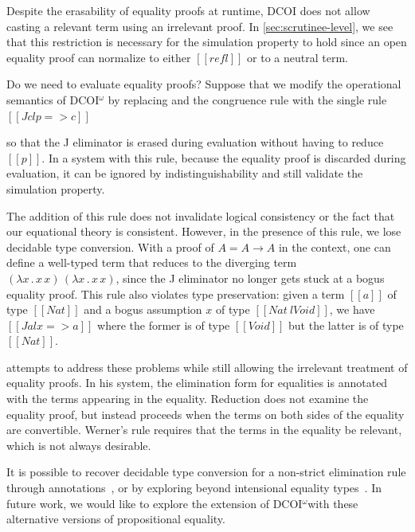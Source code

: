 \documentclass[acmsmall, screen=true, nonacm=true,
  review=\ifpublic false\else true\fi,
  anonymous=\ifanonymous true\else false\fi
]{acmart}
\makeatletter
\newcommand{\sw}[1]{}
\newcommand{\dcoi}{DCOI\@\xspace}
\newcommand{\name}{\texorpdfstring{DCOI$^{\omega}$\@\xspace}{DCOI-omega}}
\makeatother
\begin{document}
Despite the erasability of equality proofs at runtime,
\dcoi does not allow casting a relevant term using an irrelevant proof.
In \cref{sec:scrutinee-level}, we see that this restriction is
necessary for the simulation property to hold since an open equality
proof can normalize to either $[[refl]]$ or to a neutral term.

Do we need to evaluate equality proofs? Suppose that we
modify the operational semantics of \name
by replacing  and the congruence rule with the single rule $[[J c l p => c]]$ %
\sw{Maybe we should write this rule as a rule and give it name, if we have space.}
so that the J eliminator is erased during evaluation without having
to reduce $[[p]]$.
In a system with this rule, because the equality proof is discarded during evaluation, it can be ignored by
indistinguishability and still validate the simulation property.

The addition of this rule does not invalidate logical consistency or the fact that
our equational theory is consistent. However, in the presence of this rule,
we lose decidable type conversion.
With a proof of $A = A \rightarrow A$ in the context,
one can define a well-typed term that reduces to the diverging
term $(\lambda x \mathpunct{.} x \, x) \, (\lambda x \mathpunct{.} x \, x)$,
since the J eliminator no longer gets stuck at a bogus equality proof.
This rule also violates type preservation: given a term $[[a]]$ of type
$[[Nat]]$ and a bogus assumption $x$ of type $[[Nat ~ l Void]]$, we
have $[[J a l x => a]]$ where the former is of type $[[Void]]$ but the
latter is of type $[[Nat]]$.

\citet{werner:proofirrel} attempts to address these problems while still
allowing the irrelevant treatment of equality proofs. In his system, the
elimination form for equalities is annotated with the terms appearing
in the equality. Reduction does not examine the equality proof,
but instead proceeds when the terms on both sides of the equality are convertible.
Werner's rule requires that the terms in the equality be relevant, which is
not always desirable.

It is possible to recover decidable type conversion for a non-strict
elimination rule through annotations~\citep{liu:dependently}, or by exploring
beyond intensional equality types~\citep{pujet:ttobs}. In future work, we
would like to explore the extension of \name with these alternative versions
of propositional equality.
\end{document}
